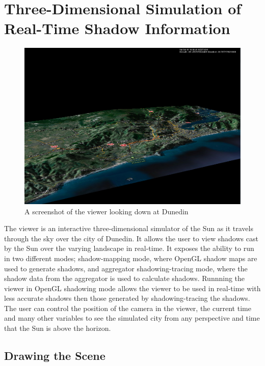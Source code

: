 \documentclass[12pt]{report}
\begin{document}
\chapter{Three-Dimensional Simulation of Real-Time Shadow Information}

\begin{figure}[h]
\centering
\includegraphics[scale=0.4]{viewer.png}
\caption{A screenshot of the viewer looking down at Dunedin}
\label{image:viewer}
\end{figure}

The viewer is an interactive three-dimensional simulator of the Sun as it travels through the sky over the city of Dunedin. It allows the user to view shadows cast by the Sun over the varying landscape in real-time. It exposes the ability to run in two different modes; shadow-mapping mode, where OpenGL shadow maps are used to generate shadows, and aggregator shadowing-tracing mode, where the shadow data from the aggregator is used to calculate shadows. Runnning the viewer in OpenGL shadowing mode allows the viewer to be used in real-time with less accurate shadows then those generated by shadowing-tracing the shadows. The user can control the position of the camera in the viewer, the current time and many other variables to see the simulated city from any perspective and time that the Sun is above the horizon.

\section{Drawing the Scene}
\end{document}
